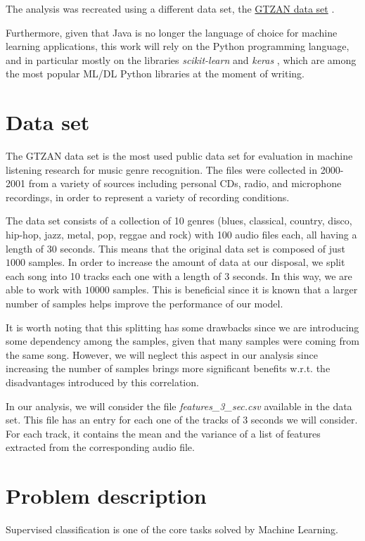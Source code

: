 \documentclass{Configuration_Files/PoliMi3i_thesis}
\begin{document}
The analysis was recreated using a different data set, the \href{https://www.kaggle.com/data sets/andradaolteanu/gtzan-data set-music-genre-classification?resource=download-directory}{GTZAN data set} \cite{gtzan}.

Furthermore, given that Java is no longer the language of choice for machine learning applications, this work will rely on the Python programming language, and in particular mostly on the libraries \textit{scikit-learn} \cite{scikit-learn} and \textit{keras} \cite{chollet2015keras}, which are among the most popular ML/DL Python libraries at the moment of writing.

\section*{Data set}
\label{sec:dataset}%
The GTZAN data set is the most used public data set for evaluation in machine listening research for music genre recognition. The files were collected in 2000-2001 from a variety of sources including personal CDs, radio, and microphone recordings, in order to represent a variety of recording conditions.

The data set consists of a collection of 10 genres (blues, classical, country, disco, hip-hop, jazz, metal, pop, reggae and rock) with 100 audio files each, all having a length of 30 seconds. This means that the original data set is composed of just $1000$ samples. In order to increase the amount of data at our disposal, we split each song into 10 tracks each one with a length of 3 seconds. In this way, we are able to work with $10000$ samples. This is beneficial since it is known that a larger number of samples helps improve the performance of our model. 

It is worth noting that this splitting has some drawbacks since we are introducing some dependency among the samples, given that many samples were coming from the same song. However, we will neglect this aspect in our analysis since increasing the number of samples brings more significant benefits w.r.t. the disadvantages introduced by this correlation.

In our analysis, we will consider the file \textit{features\_3\_sec.csv} available in the data set. This file has an entry for each one of the tracks of 3 seconds we will consider. For each track, it contains the mean and the variance of a list of features extracted from the corresponding audio file.


\section*{Problem description}
\label{sec:problem_desc}
Supervised classification is one of the core tasks solved by Machine Learning.
\end{document}
